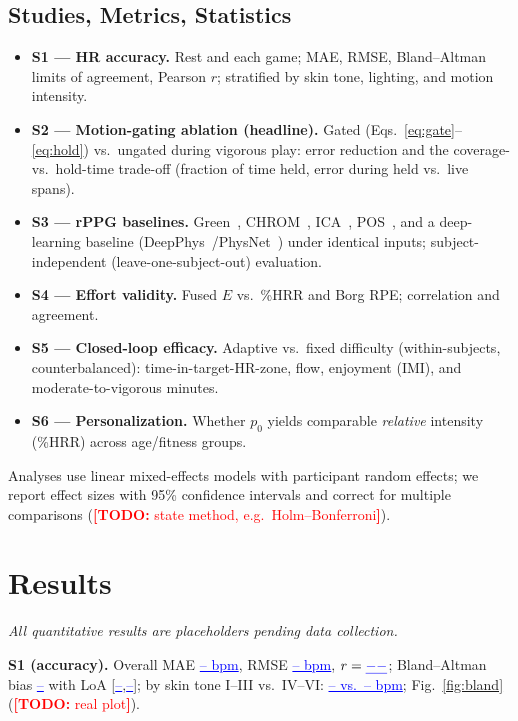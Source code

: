 \documentclass[journal,10pt]{IEEEtran}
\newcommand{\todoNote}[1]{\textcolor{red}{\textbf{[TODO:} #1\textbf{]}}}
\newcommand{\result}[1]{\textcolor{blue}{\underline{#1}}}
\begin{document}
\subsection{Studies, Metrics, Statistics}
\begin{itemize}
\item \textbf{S1 --- HR accuracy.} Rest and each game; MAE, RMSE, Bland--Altman
limits of agreement, Pearson $r$; stratified by skin tone, lighting, and motion
intensity.
\item \textbf{S2 --- Motion-gating ablation (headline).} Gated
(Eqs.~\eqref{eq:gate}--\eqref{eq:hold}) vs.\ ungated during vigorous play: error
reduction and the coverage-vs.\ hold-time trade-off (fraction of time held, error
during held vs.\ live spans).
\item \textbf{S3 --- rPPG baselines.} Green~\cite{verkruysse2008},
CHROM~\cite{dehaan2013}, ICA~\cite{poh2010}, POS~\cite{wang2017}, and a
deep-learning baseline (DeepPhys~\cite{chen2018}/PhysNet~\cite{yu2019}) under
identical inputs; subject-independent (leave-one-subject-out) evaluation.
\item \textbf{S4 --- Effort validity.} Fused $E$ vs.\ \%HRR and Borg RPE;
correlation and agreement.
\item \textbf{S5 --- Closed-loop efficacy.} Adaptive vs.\ fixed difficulty
(within-subjects, counterbalanced): time-in-target-HR-zone, flow, enjoyment (IMI),
and moderate-to-vigorous minutes.
\item \textbf{S6 --- Personalization.} Whether $p_0$ yields comparable
\emph{relative} intensity (\%HRR) across age/fitness groups.
\end{itemize}
Analyses use linear mixed-effects models with participant random effects;
we report effect sizes with 95\% confidence intervals and correct for multiple
comparisons (\todoNote{state method, e.g.\ Holm--Bonferroni}).

\section{Results}\label{sec:results}
\emph{All quantitative results are placeholders pending data collection.}

\textbf{S1 (accuracy).} Overall MAE \result{-- bpm}, RMSE \result{-- bpm},
$r=\result{--}$; Bland--Altman bias \result{--} with LoA
[\result{--},\result{--}]; by skin tone I--III vs.\ IV--VI:
\result{-- vs.\ -- bpm}; Fig.~\ref{fig:bland} (\todoNote{real plot}).
\end{document}

